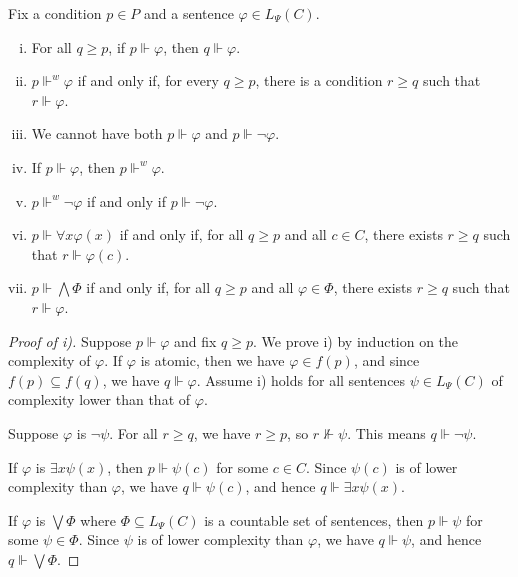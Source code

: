 \documentclass{scrartcl}
\renewcommand{\phi}{\varphi}
\begin{document}
\begin{proposition}
\label{P:Forcing}
Fix a condition $p\in P$ and a sentence $\phi\in L_\Psi(C)$.

\begin{enumerate}[i)]

\item
For all $q\ge p$, if $p\Vdash \phi$, then $q\Vdash \phi$.

\item
$p\Vdash^w \phi$ if and only if, for every $q\ge p$, there is a condition $r\ge q$ such that $r\Vdash \phi$.

\item
We cannot have both $p\Vdash \phi$ and $p\Vdash \neg \phi$.

\item
If $p\Vdash \phi$, then $p\Vdash^w \phi$.

\item
$p\Vdash^w \neg\phi$ if and only if $p\Vdash \neg\phi$.

\item
$p\Vdash\forall x\phi(x)$ if and only if, for all $q\ge p$ and all $c\in C$, there exists $r\ge q$ such that $r\Vdash\phi(c)$.

\item
$p\Vdash\bigwedge\Phi$ if and only if, for all $q\ge p$ and all $\phi\in\Phi$, there exists $r\ge q$ such that $r\Vdash \phi$.

\end{enumerate}

\end{proposition}


\begin{proof}[Proof of i)]

Suppose $p\Vdash \phi$ and fix  $q\ge p$. We prove i) by induction on the complexity of $\phi$.
If $\phi$ is atomic, then we have $\phi \in f(p)$, and since $f(p)\subseteq f(q)$, we have $q\Vdash \phi$.
Assume i) holds for all sentences  $\psi \in L_\Psi(C)$ of complexity lower than that of $\phi$.

Suppose $\phi$ is $\neg \psi$. For all $r\ge q$, we have $r \ge p$, so $r\not\Vdash \psi$. This means $q\Vdash \neg \psi$.

If $\phi$ is $\exists x \psi(x)$, then $p\Vdash \psi(c)$ for some $c\in C$. Since $\psi(c)$ is of lower complexity than $\phi$, we have $q\Vdash \psi(c)$, and hence $q\Vdash \exists x \psi(x)$.

If $\phi$ is $\bigvee \Phi$ where $\Phi \subseteq L_\Psi(C)$ is a countable set of sentences, then $p\Vdash \psi$ for some $\psi\in \Phi$. Since $\psi$ is of lower complexity than $\phi$, we have $q\Vdash \psi$, and hence $q\Vdash \bigvee \Phi$.
\end{proof}
\end{document}
